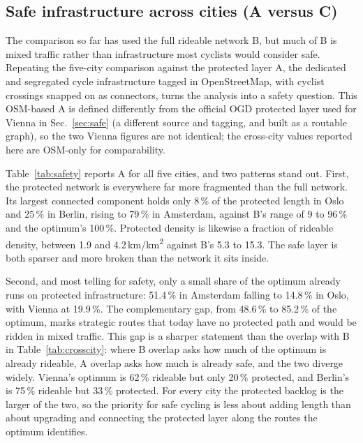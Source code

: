 \documentclass[11pt,a4paper]{article}
\begin{document}
\subsection{Safe infrastructure across cities (A versus C)}
\label{sec:safetycross}

The comparison so far has used the full rideable network B, but much of B is mixed
traffic rather than infrastructure most cyclists would consider safe. Repeating the
five-city comparison against the protected layer A, the dedicated and segregated cycle
infrastructure tagged in OpenStreetMap, with cyclist crossings snapped on as connectors,
turns the analysis into a safety question. This OSM-based A is defined differently from the
official OGD protected layer used for Vienna in Sec.~\ref{sec:safe} (a different source and
tagging, and built as a routable graph), so the two Vienna figures are not identical; the
cross-city values reported here are OSM-only for comparability.

Table~\ref{tab:safety} reports A for all five cities, and two patterns stand out. First,
the protected network is everywhere far more fragmented than the full network. Its largest
connected component holds only 8\,\% of the protected length in Oslo and 25\,\% in Berlin,
rising to 79\,\% in Amsterdam, against B's range of 9 to 96\,\% and the optimum's 100\,\%.
Protected density is likewise a fraction of rideable density, between 1.9 and
4.2\,km/km\textsuperscript{2} against B's 5.3 to 15.3. The safe layer is both sparser and
more broken than the network it sits inside.

Second, and most telling for safety, only a small share of the optimum already runs on
protected infrastructure: 51.4\,\% in Amsterdam falling to 14.8\,\% in Oslo, with Vienna at
19.9\,\%. The complementary gap, from 48.6\,\% to 85.2\,\% of the optimum, marks strategic
routes that today have no protected path and would be ridden in mixed traffic. This gap is a
sharper statement than the overlap with B in Table~\ref{tab:crosscity}: where B overlap asks
how much of the optimum is already rideable, A overlap asks how much is already safe, and the
two diverge widely. Vienna's optimum is 62\,\% rideable but only 20\,\% protected, and
Berlin's is 75\,\% rideable but 33\,\% protected. For every city the protected backlog is
the larger of the two, so the priority for safe cycling is less about adding length than
about upgrading and connecting the protected layer along the routes the optimum identifies.
\end{document}
